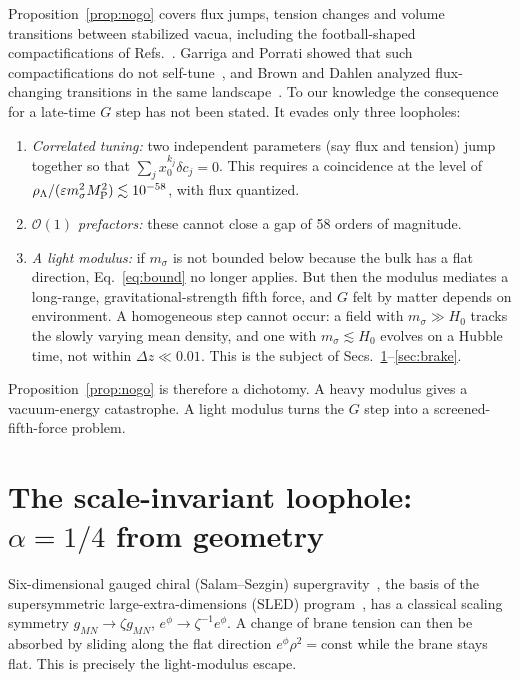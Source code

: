 \documentclass[aps,prd,reprint,superscriptaddress,nofootinbib,floatfix]{revtex4-2}
\theoremstyle{definition}
\newcommand{\MP}{M_{\rm P}}
\begin{document}
Proposition~\ref{prop:nogo} covers flux jumps, tension changes and volume transitions between stabilized vacua, including the football-shaped compactifications of Refs.~\cite{CarrollGuica2003,Navarro2003}. Garriga and Porrati showed that such compactifications do not self-tune~\cite{GarrigaPorrati2004}, and Brown and Dahlen analyzed flux-changing transitions in the same landscape~\cite{BrownDahlen2010}. To our knowledge the consequence for a late-time $G$ step has not been stated. It evades only three loopholes:
\begin{enumerate}
\item \emph{Correlated tuning:} two independent parameters (say flux and tension) jump together so that $\sum_j x_0^{k_j}\delta c_j=0$. This requires a coincidence at the level of $\rho_\Lambda/(\varepsilon m_\sigma^2\MP^2)\lesssim10^{-58}$, with flux quantized.
\item \emph{$\mathcal{O}(1)$ prefactors:} these cannot close a gap of 58 orders of magnitude.
\item \emph{A light modulus:} if $m_\sigma$ is not bounded below because the bulk has a flat direction, Eq.~\eqref{eq:bound} no longer applies. But then the modulus mediates a long-range, gravitational-strength fifth force, and $G$ felt by matter depends on environment. A homogeneous step cannot occur: a field with $m_\sigma\gg H_0$ tracks the slowly varying mean density, and one with $m_\sigma\lesssim H_0$ evolves on a Hubble time, not within $\Delta z\ll0.01$. This is the subject of Secs.~\ref{sec:loophole}--\ref{sec:brake}.
\end{enumerate}
Proposition~\ref{prop:nogo} is therefore a dichotomy. A heavy modulus gives a vacuum-energy catastrophe. A light modulus turns the $G$ step into a screened-fifth-force problem.

\section{The scale-invariant loophole: $\alpha=1/4$ from geometry}\label{sec:loophole}

Six-dimensional gauged chiral (Salam--Sezgin) supergravity~\cite{SalamSezgin1984}, the basis of the supersymmetric large-extra-dimensions (SLED) program~\cite{ABPQ2004,ABRS2001}, has a classical scaling symmetry $g_{MN}\to\zeta g_{MN}$, $e^{\phi}\to\zeta^{-1}e^{\phi}$. A change of brane tension can then be absorbed by sliding along the flat direction $e^{\phi}\rho^2=\text{const}$ while the brane stays flat. This is precisely the light-modulus escape.
\end{document}
